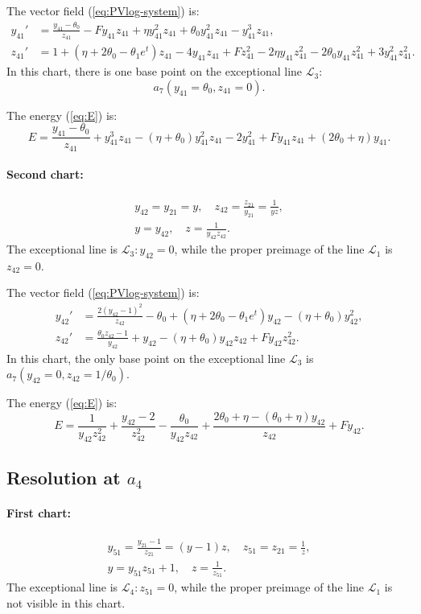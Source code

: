 The vector field  (\ref{eq:PVlog-system}) is:
$$
\begin{aligned}
y_{41}'&=
\frac{y_{41}-\theta_0}{z_{41}}  - F y_{41} z_{41} + \eta y_{41}^2 z_{41} + \theta_0 y_{41}^2 z_{41} - 
 y_{41}^3 z_{41}
 ,
\\
z_{41}'&= 
1 + (\eta + 2 \theta_0-\theta_1 e^t ) z_{41} - 4 y_{41} z_{41} + F z_{41}^2 - 2 \eta y_{41} z_{41}^2 - 
 2 \theta_0 y_{41} z_{41}^2 + 3 y_{41}^2 z_{41}^2
.
\end{aligned}
$$
In this chart, there is one base point on the exceptional line $\mathcal{L}_3$:
$$
a_7(y_{41}=\theta_0,z_{41}=0).
$$

The energy (\ref{eq:E}) is:
$$
E=
\frac{y_{41}-\theta_0}{z_{41}}
+y_{41}^3 z_{41}
-(\eta+\theta_0) y_{41}^2 z_{41}
-2 y_{41}^2
+F y_{41} z_{41}+(2 \theta_0+\eta) y_{41}.
$$



\paragraph{Second chart:}
\begin{gather*}
y_{42}=y_{21}=y,
\quad
z_{42}=\frac{z_{21}}{y_{21}}=\frac1{yz},
\\
y=y_{42},
\quad
z=\frac1{y_{42}z_{42}}.
\end{gather*}
The exceptional line is $\mathcal{L}_3 : y_{42}=0$, while the proper preimage of the line $\mathcal{L}_{1}$ is $z_{42}=0$. 

The vector field  (\ref{eq:PVlog-system}) is:
$$
\begin{aligned}
y_{42}'&=
\frac{ 2 ( y_{42}-1)^2}{z_{42}}
-\theta_0 + (\eta + 2 \theta_0-\theta_1 e^t) y_{42} - (\eta + \theta_0) y_{42}^2
,
\\
z_{42}'&=
\frac{\theta_0 z_{42}-1}{y_{42}}+ y_{42}  - (\eta + \theta_0) y_{42} z_{42} + 
 F y_{42} z_{42}^2
.
\end{aligned}
$$
In this chart, the only base point on the exceptional line $\mathcal{L}_3$ is $a_7(y_{42}=0,z_{42}=1/\theta_0)$.

The energy (\ref{eq:E}) is:
$$
E=
\frac{1}{y_{42} z_{42}^2}
+\frac{y_{42}-2}{z_{42}^2}-\frac{\theta_0}{y_{42} z_{42}}
+\frac{2 \theta_0+\eta-(\theta_0+\eta)y_{42}}{z_{42}}
+F y_{42}
.
$$



\subsection{Resolution at $a_4$}
\paragraph{First chart:}
\begin{gather*}
y_{51}=\frac{y_{21}-1}{z_{21}}=(y-1)z,
\quad
z_{51}=z_{21}=\frac1z,
\\
y=y_{51}z_{51}+1,
\quad
z=\frac1{z_{51}}.
\end{gather*}
The exceptional line is $\mathcal{L}_4 : z_{51}=0$, while the proper preimage of the line $\mathcal{L}_{1}$ is not visible in this chart. 

